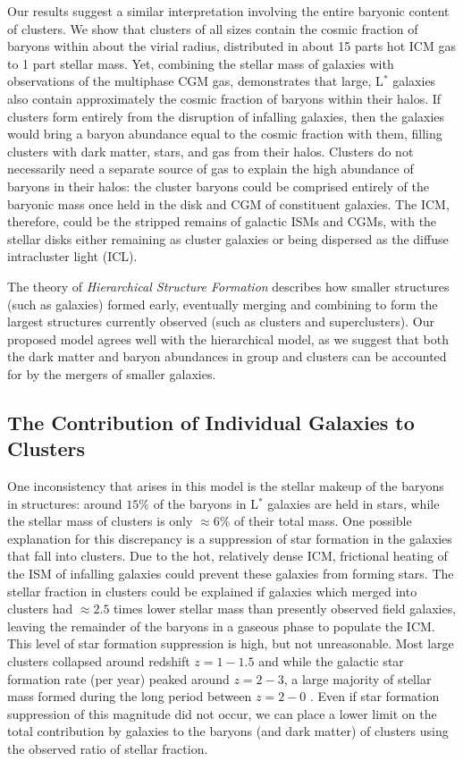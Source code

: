 Our results suggest a similar interpretation involving the entire
baryonic content of clusters. We show that clusters of all sizes
contain the cosmic fraction of baryons within about the virial radius,
distributed in about 15 parts hot ICM gas to 1 part stellar mass. Yet,
combining the stellar mass of galaxies with observations of the
multiphase CGM gas, \citet{Werk2014} demonstrates that large, L$^*$
galaxies also contain approximately the cosmic fraction of baryons
within their halos. If clusters form entirely from the disruption of
infalling galaxies, then the galaxies would bring a baryon abundance
equal to the cosmic fraction with them, filling clusters with dark
matter, stars, and gas from their halos. Clusters do not necessarily
need a separate source of gas to explain the high abundance of baryons
in their halos: the cluster baryons could be comprised entirely of the
baryonic mass once held in the disk and CGM of constituent
galaxies. The ICM, therefore, could be the stripped remains of
galactic ISMs and CGMs, with the stellar disks either remaining as
cluster galaxies or being dispersed as the diffuse intracluster light
(ICL).

The theory of \textit{Hierarchical Structure Formation} describes how
smaller structures (such as galaxies) formed early, eventually
merging and combining to form the largest structures currently
observed (such as clusters and superclusters). Our proposed model
agrees well with the hierarchical model, as we suggest that both the dark
matter and baryon abundances in group and clusters can be accounted for
by the mergers of smaller galaxies. 

\subsection{The Contribution of Individual Galaxies to Clusters}
\label{sec:Implications.Individual}

One inconsistency that arises in this model is the stellar makeup of
the baryons in structures: around $15\%$ of the baryons in L$^*$
galaxies are held in stars, while the stellar mass of clusters is only
$\approx6\%$ of their total mass. One possible explanation for this
discrepancy is a suppression of star formation in the galaxies that
fall into clusters. Due to the hot, relatively dense ICM, frictional
heating of the ISM of infalling galaxies could prevent these galaxies
from forming stars. The stellar fraction in clusters could be
explained if galaxies which merged into clusters had $\approx 2.5$
times lower stellar mass than presently observed field galaxies,
leaving the remainder of the baryons in a gaseous phase to populate
the ICM. This level of star formation suppression is high, but not
unreasonable. Most large clusters collapsed around redshift $z=1-1.5$
\citep{Eke1996, Battaglia2013} and while the galactic star formation
rate (per year) peaked around $z=2-3$, a large majority of stellar
mass formed during the long period between $z=2-0$
\citep{Hopkins2006}. Even if star formation suppression of this
magnitude did not occur, we can place a lower limit on the total
contribution by galaxies to the baryons (and dark matter) of clusters
using the observed ratio of stellar fraction.

